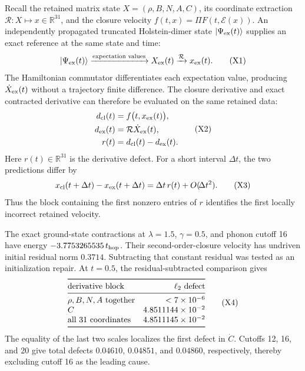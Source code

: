 \documentclass[10pt,letterpaper,twocolumn]{article}
\newcommand{\R}{\mathbb R}
\begin{document}
Recall the retained matrix state
\(X=(\rho,B,N,A,C)\), its coordinate extraction
\(\mathcal R:X\mapsto x\in\R^{31}\), and the closure velocity
\(f(t,x)=\Pi F(t,\mathcal E(x))\).  An independently propagated truncated
Holstein-dimer state \(\lvert\Psi_{\rm ex}(t)\rangle\) supplies an exact
reference at the same state and time:
\[
\lvert\Psi_{\rm ex}(t)\rangle
\xrightarrow{\text{expectation values}}
X_{\rm ex}(t)
\xrightarrow{\mathcal R}
x_{\rm ex}(t).
\tag{X1}
\]
The Hamiltonian commutator differentiates each expectation value, producing
\(\dot X_{\rm ex}(t)\) without a trajectory finite difference.  The closure
derivative and exact contracted derivative can therefore be evaluated on the
same retained data:
\[
\begin{aligned}
d_{\rm cl}(t)&=f\bigl(t,x_{\rm ex}(t)\bigr),\\
d_{\rm ex}(t)&=\mathcal R\dot X_{\rm ex}(t),\\
r(t)&=d_{\rm cl}(t)-d_{\rm ex}(t).
\end{aligned}
\tag{X2}
\]
Here \(r(t)\in\R^{31}\) is the derivative defect.  For a short interval
\(\Delta t\), the two predictions differ by
\[
x_{\rm cl}(t+\Delta t)-x_{\rm ex}(t+\Delta t)
=\Delta t\,r(t)+O(\!\Delta t^2).
\tag{X3}
\]
Thus the block containing the first nonzero entries of \(r\) identifies the
first locally incorrect retained velocity.

The exact ground-state contractions at
\(\lambda=1.5\), \(\gamma=0.5\), and phonon cutoff 16 have energy
\(-3.7753265535\,t_{\rm hop}\).  Their second-order-closure velocity has
undriven initial residual norm \(0.3714\).
Subtracting that constant residual was tested as an initialization repair.
At \(t=0.5\), the residual-subtracted comparison gives
\[
\begin{array}{@{}l r@{}}
\toprule
\text{derivative block} & \ell_2\text{ defect}\\
\midrule
\rho,B,N,A\ \text{together} & <7\times10^{-6}\\
C & 4.8511144\times10^{-2}\\
\text{all 31 coordinates} & 4.8511145\times10^{-2}\\
\bottomrule
\end{array}
\tag{X4}
\]
The equality of the last two scales localizes the first defect in \(\dot C\).
Cutoffs 12, 16, and 20 give total defects \(0.04610\), \(0.04851\), and
\(0.04860\), respectively, thereby excluding cutoff 16 as the leading cause.
\end{document}
